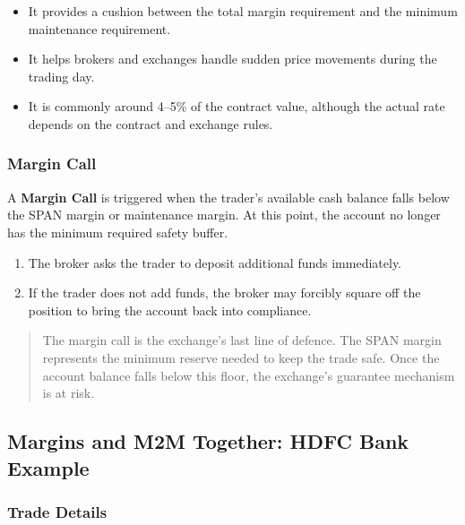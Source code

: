 \documentclass[12pt,openany]{book}
\begin{document}
\begin{itemize}[leftmargin=*]
    \item It provides a cushion between the total margin requirement and the minimum maintenance requirement.
    \item It helps brokers and exchanges handle sudden price movements during the trading day.
    \item It is commonly around 4--5\% of the contract value, although the actual rate depends on the contract and exchange rules.
\end{itemize}

\subsubsection{Margin Call}
A \textbf{Margin Call} is triggered when the trader's available cash balance falls below the SPAN margin or maintenance margin. At this point, the account no longer has the minimum required safety buffer.

\begin{enumerate}[leftmargin=*]
    \item The broker asks the trader to deposit additional funds immediately.
    \item If the trader does not add funds, the broker may forcibly square off the position to bring the account back into compliance.
\end{enumerate}

\begin{quote}
The margin call is the exchange's last line of defence. The SPAN margin represents the minimum reserve needed to keep the trade safe. Once the account balance falls below this floor, the exchange's guarantee mechanism is at risk.
\end{quote}

\subsection{Margins and M2M Together: HDFC Bank Example}

\subsubsection{Trade Details}
\end{document}
